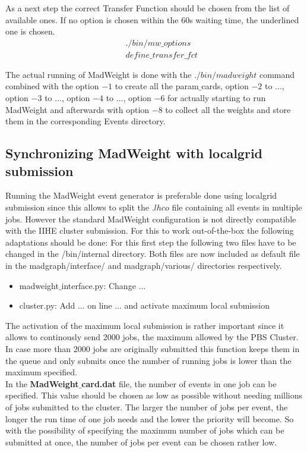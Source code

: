 As a next step the correct Transfer Function should be chosen from the list of available ones. If no option is chosen within the 60s waiting time, the underlined one is chosen.
\begin{eqnarray}
  & & ./bin/mw\_options \nonumber \\
  & & define\_transfer\_fct \nonumber
\end{eqnarray}

The actual running of MadWeight is done with the $./bin/madweight$ command combined with the option $-1$ to create all the param$\_$cards, option $-2$ to ..., option $-3$ to ..., option $-4$ to ..., option $-6$ for actually starting to run MadWeight and afterwards with option $-8$ to collect all the weights and store them in the corresponding Events directory.

\subsection{Synchronizing MadWeight with localgrid submission}\label{sec::MWOptions}

Running the MadWeight event generator is preferable done using localgrid submission since this allows to split the $.lhco$ file containing all events in multiple jobs. However the standard MadWeight configuration is not directly compatible with the IIHE cluster submission. For this to work out-of-the-box the following adaptations should be done:
For this first step the following two files have to be changed in the /bin/internal directory. Both files are now included as default file in the madgraph/interface/ and madgraph/various/ directories respectively.
\begin{itemize}
  \item madweight$\_$interface.py: Change ...
  \item cluster.py: Add ... on line ... and activate maximum local submission
\end{itemize}

The activation of the maximum local submission is rather important since it allows to continously send 2000 jobs, the maximum allowed by the PBS Cluster. In case more than 2000 jobs are originally submitted this function keeps them in the queue and only submits once the number of running jobs is lower than the maximum specified.\\
In the \textbf{MadWeight$\_$card.dat} file, the number of events in one job can be specified. This value should be chosen as low as possible without needing millions of jobs submitted to the cluster. The larger the number of jobs per event, the longer the run time of one job needs and the lower the priority will become. So with the possibility of specifying the maximum number of jobs which can be submitted at once, the number of jobs per event can be chosen rather low.

